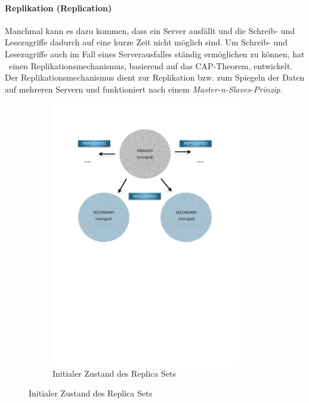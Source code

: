 \paragraph{Replikation (Replication)}\label{replication}
Manchmal kann es dazu kommen, dass ein Server ausfällt und die Schreib- und Lesezugriffe dadurch auf eine kurze Zeit nicht möglich sind. Um Schreib- und Lesezugriffe auch im Fall eines Serverausfalles ständig ermöglichen zu können, hat \mongo\ einen Replikationsmechanismus, basierend auf das CAP-Theorem, entwickelt. Der Replikationsmechanismus dient zur Replikation bzw. zum Spiegeln der Daten auf mehreren Servern und funktioniert nach einem \textit{Master-n-Slaves-Prinzip.}
\begin{figure}[H]
   \begin{subfigure}[t]{0.49\textwidth}\vspace{0pt}
   \centering
      \includegraphics[trim = 28mm 139mm 28mm 29mm, clip, width=0.9\textwidth]{resources/replicaSet/createReplicaSet2}
      \caption[Initialer Zustand des Replica Sets]{Initialer Zustand des Replica Sets}

\end{subfigure}
\end{figure}
